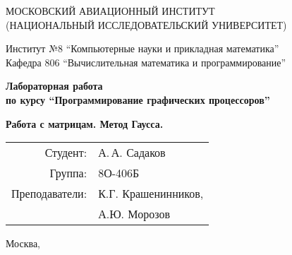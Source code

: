 \begin{titlepage}
\begin{center}

МОСКОВСКИЙ АВИАЦИОННЫЙ ИНСТИТУТ\\ (НАЦИОНАЛЬНЫЙ ИССЛЕДОВАТЕЛЬСКИЙ УНИВЕРСИТЕТ)

\vspace{18pt}

Институт №8 \enquote{Компьютерные науки и прикладная математика}\\
Кафедра 806 \enquote{Вычислительная математика и программирование}


\vspace{68pt}
\textbf{
Лабораторная работа \\ по курсу \enquote{Программирование графических процессоров}
}

\vspace{48pt}
\textbf{
Работа с матрицам. Метод Гаусса.
}

\end{center}

\vspace{160pt}

\begin{flushright}
\begin{tabular}{rl}
Студент: & А.\,А. Садаков \\
Группа: & 8О-406Б \\
Преподаватели: & К.Г. Крашенинников,\\
 & А.Ю. Морозов\\
\end{tabular}
\end{flushright}

\vfill

\begin{center}
Москва, \the\year
\end{center}
\end{titlepage}

\pagebreak
